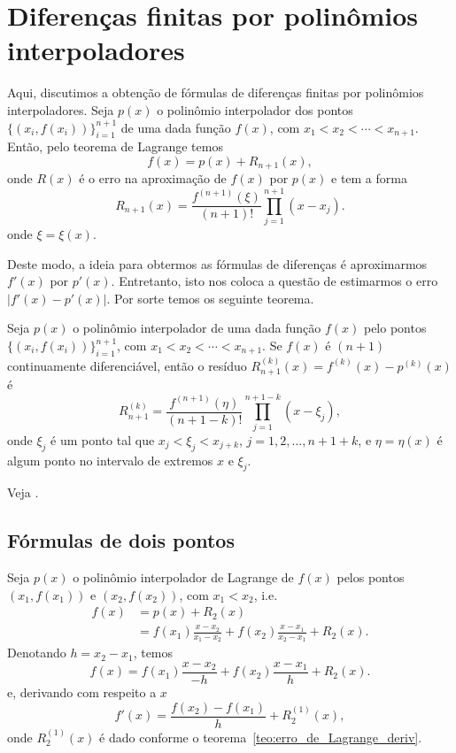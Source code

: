 \section{Diferenças finitas por polinômios interpoladores}\label{cap_deriv_sec_df_pi}

Aqui, discutimos a obtenção de fórmulas de diferenças finitas por polinômios interpoladores. Seja $p(x)$ o polinômio interpolador dos pontos $\{(x_i,f(x_i))\}_{i=1}^{n+1}$ de uma dada função $f(x)$, com $x_1 < x_2 < \cdots < x_{n+1}$. Então, pelo teorema de Lagrange temos
\begin{equation}
  f(x) = p(x) + R_{n+1}(x),
\end{equation}
onde $R(x)$ é o erro na aproximação de $f(x)$ por $p(x)$ e tem a forma
\begin{equation}
  R_{n+1}(x) = \frac{f^{(n+1)}(\xi)}{(n+1)!}\prod_{j=1}^{n+1}(x-x_j).
\end{equation}
onde $\xi = \xi(x)$.

Deste modo, a ideia para obtermos as fórmulas de diferenças é aproximarmos $f'(x)$ por $p'(x)$. Entretanto, isto nos coloca a questão de estimarmos o erro $|f'(x) - p'(x)|$. Por sorte temos os seguinte teorema.

\begin{teo}\label{teo:erro_de_Lagrange_deriv}
  Seja $p(x)$ o polinômio interpolador de uma dada função $f(x)$ pelo pontos $\{(x_i, f(x_i))\}_{i=1}^{n+1}$, com $x_1<x_2<\cdots<x_{n+1}$. Se $f(x)$ é $(n+1)$ continuamente diferenciável, então o resíduo $R_{n+1}^{(k)}(x) = f^{(k)}(x) - p^{(k)}(x)$ é
  \begin{equation}
    R_{n+1}^{(k)} = \frac{f^{(n+1)}(\eta) }{(n+1-k)!}\prod_{j=1}^{n+1-k}(x-\xi_j),
  \end{equation}
onde $\xi_j$ é um ponto tal que $x_j < \xi_j < x_{j+k}$, $j=1, 2, \dotsc, n+1+k$, e $\eta = \eta(x)$ é algum ponto no intervalo de extremos $x$ e $\xi_j$. 
\end{teo}
\begin{dem}
  Veja \cite[Ch.6, Sec.5]{Isaacson1994a}.
\end{dem}

\subsection{Fórmulas de dois pontos}

Seja $p(x)$ o polinômio interpolador de Lagrange de $f(x)$ pelos pontos $(x_1, f(x_1))$ e $(x_2, f(x_2))$, com $x_1 < x_2$, i.e.
\begin{align}
  f(x) &= p(x) + R_{2}(x)\\
  &= f(x_1)\frac{x-x_2}{x_1-x_2} + f(x_2)\frac{x-x_1}{x_2-x_1} + R_2(x).
\end{align}
Denotando $h=x_2-x_1$, temos
\begin{equation}
  f(x) = f(x_1)\frac{x-x_2}{-h} + f(x_2)\frac{x-x_1}{h} + R_2(x).
\end{equation}
e, derivando com respeito a $x$
\begin{equation}
  f'(x) = \frac{f(x_2)-f(x_1)}{h} + R_2^{(1)}(x),
\end{equation}
onde $ R_2^{(1)}(x)$ é dado conforme o teorema~\ref{teo:erro_de_Lagrange_deriv}.

